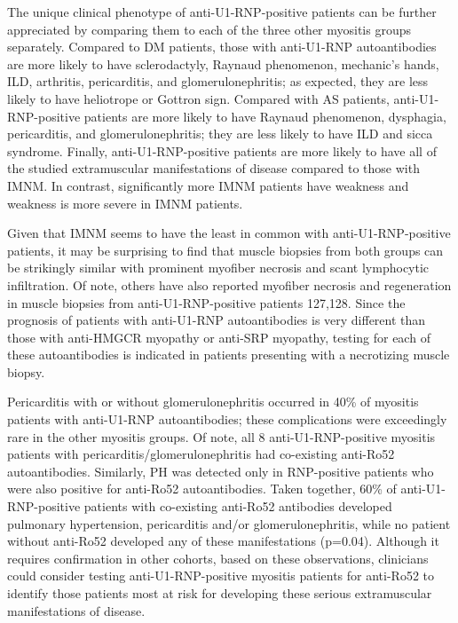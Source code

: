 The unique clinical phenotype of anti-U1-RNP-positive patients can be further appreciated by comparing them to each of the three other myositis groups separately.  Compared to DM patients, those with anti-U1-RNP autoantibodies are more likely to have sclerodactyly, Raynaud phenomenon, mechanic’s hands, ILD, arthritis, pericarditis, and glomerulonephritis; as expected, they are less likely to have heliotrope or Gottron sign.  Compared with AS patients, anti-U1-RNP-positive patients are more likely to have Raynaud phenomenon, dysphagia, pericarditis, and glomerulonephritis; they are less likely to have ILD and sicca syndrome.  Finally, anti-U1-RNP-positive patients are more likely to have all of the studied extramuscular manifestations of disease compared to those with IMNM.  In contrast, significantly more IMNM patients have weakness and weakness is more severe in IMNM patients.  

Given that IMNM seems to have the least in common with anti-U1-RNP-positive patients, it may be surprising to find that muscle biopsies from both groups can be strikingly similar with prominent myofiber necrosis and scant lymphocytic infiltration.  Of note, others have also reported myofiber necrosis and regeneration in muscle biopsies from anti-U1-RNP-positive patients 127,128.  Since the prognosis of patients with anti-U1-RNP autoantibodies is very different than those with anti-HMGCR myopathy or anti-SRP myopathy, testing for each of these autoantibodies is indicated in patients presenting with a necrotizing muscle biopsy. 

Pericarditis with or without glomerulonephritis occurred in 40\% of myositis patients with anti-U1-RNP autoantibodies; these complications were exceedingly rare in the other myositis groups.  Of note, all 8 anti-U1-RNP-positive myositis patients with pericarditis/glomerulonephritis had co-existing anti-Ro52 autoantibodies.  Similarly, PH was detected only in RNP-positive patients who were also positive for anti-Ro52 autoantibodies.  Taken together, 60\% of anti-U1-RNP-positive patients with co-existing anti-Ro52 antibodies developed pulmonary hypertension, pericarditis and/or glomerulonephritis, while no patient without anti-Ro52 developed any of these manifestations (p=0.04).  Although it requires confirmation in other cohorts, based on these observations, clinicians could consider testing anti-U1-RNP-positive myositis patients for anti-Ro52 to identify those patients most at risk for developing these serious extramuscular manifestations of disease.

